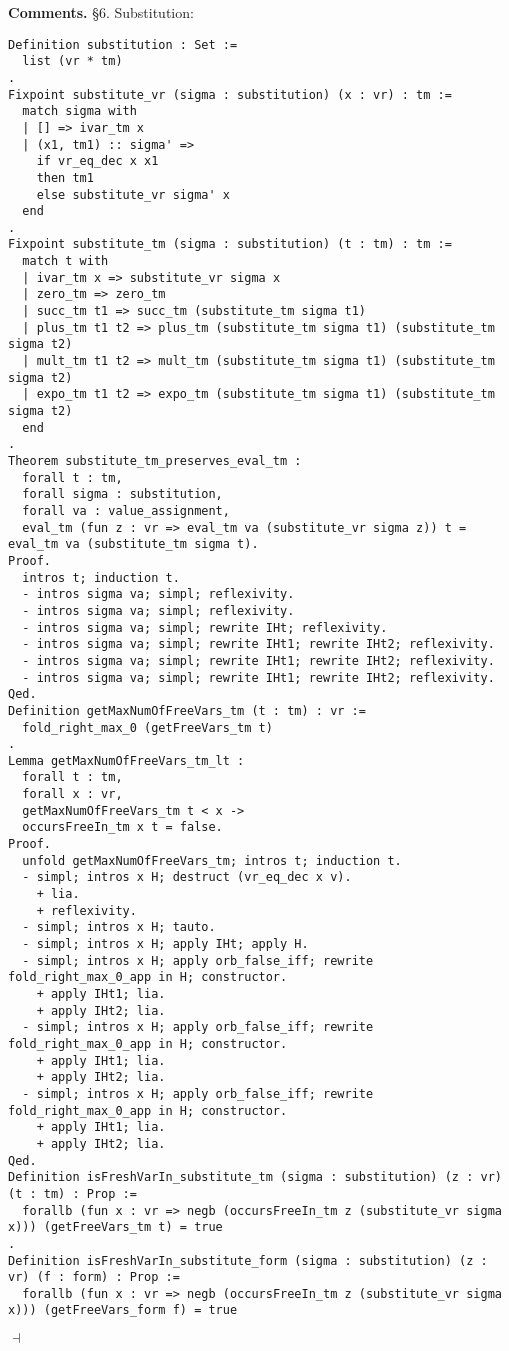 \documentclass[12pt]{paper}
\newenvironment{context}[1][]{\noindent \textbf{{#1}.}}{\hfill $ \dashv $}
\begin{document}
\begin{context}[Comments]
    \S6. Substitution:
\begin{lstlisting}[frame=single]
Definition substitution : Set :=
  list (vr * tm)
.
Fixpoint substitute_vr (sigma : substitution) (x : vr) : tm :=
  match sigma with
  | [] => ivar_tm x
  | (x1, tm1) :: sigma' =>
    if vr_eq_dec x x1
    then tm1
    else substitute_vr sigma' x
  end
.
Fixpoint substitute_tm (sigma : substitution) (t : tm) : tm :=
  match t with
  | ivar_tm x => substitute_vr sigma x
  | zero_tm => zero_tm
  | succ_tm t1 => succ_tm (substitute_tm sigma t1)
  | plus_tm t1 t2 => plus_tm (substitute_tm sigma t1) (substitute_tm sigma t2)
  | mult_tm t1 t2 => mult_tm (substitute_tm sigma t1) (substitute_tm sigma t2)
  | expo_tm t1 t2 => expo_tm (substitute_tm sigma t1) (substitute_tm sigma t2)
  end
.
Theorem substitute_tm_preserves_eval_tm :
  forall t : tm,
  forall sigma : substitution,
  forall va : value_assignment,
  eval_tm (fun z : vr => eval_tm va (substitute_vr sigma z)) t = eval_tm va (substitute_tm sigma t).
Proof.
  intros t; induction t.
  - intros sigma va; simpl; reflexivity.
  - intros sigma va; simpl; reflexivity.
  - intros sigma va; simpl; rewrite IHt; reflexivity.
  - intros sigma va; simpl; rewrite IHt1; rewrite IHt2; reflexivity.
  - intros sigma va; simpl; rewrite IHt1; rewrite IHt2; reflexivity.
  - intros sigma va; simpl; rewrite IHt1; rewrite IHt2; reflexivity.
Qed.
Definition getMaxNumOfFreeVars_tm (t : tm) : vr :=
  fold_right_max_0 (getFreeVars_tm t)
.
Lemma getMaxNumOfFreeVars_tm_lt :
  forall t : tm,
  forall x : vr,
  getMaxNumOfFreeVars_tm t < x ->
  occursFreeIn_tm x t = false.
Proof.
  unfold getMaxNumOfFreeVars_tm; intros t; induction t.
  - simpl; intros x H; destruct (vr_eq_dec x v).
    + lia.
    + reflexivity.
  - simpl; intros x H; tauto.
  - simpl; intros x H; apply IHt; apply H.
  - simpl; intros x H; apply orb_false_iff; rewrite fold_right_max_0_app in H; constructor.
    + apply IHt1; lia.
    + apply IHt2; lia.
  - simpl; intros x H; apply orb_false_iff; rewrite fold_right_max_0_app in H; constructor.
    + apply IHt1; lia.
    + apply IHt2; lia.
  - simpl; intros x H; apply orb_false_iff; rewrite fold_right_max_0_app in H; constructor.
    + apply IHt1; lia.
    + apply IHt2; lia.
Qed.
Definition isFreshVarIn_substitute_tm (sigma : substitution) (z : vr) (t : tm) : Prop :=
  forallb (fun x : vr => negb (occursFreeIn_tm z (substitute_vr sigma x))) (getFreeVars_tm t) = true
.
Definition isFreshVarIn_substitute_form (sigma : substitution) (z : vr) (f : form) : Prop :=
  forallb (fun x : vr => negb (occursFreeIn_tm z (substitute_vr sigma x))) (getFreeVars_form f) = true

\end{lstlisting}
\end{context}
\end{document}
